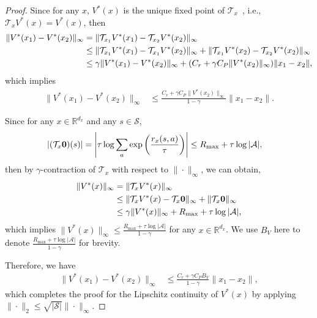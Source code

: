 \documentclass{article}
\theoremstyle{plain}
\theoremstyle{definition}
\theoremstyle{remark}
\def\R{\mathbb R}
\def\cA{\mathcal A}
\def\cS{\mathcal S}
\def\cT{\mathcal T}
\begin{document}
\begin{proof}
    Since for any $x$, $V^*(x)$ is the unique fixed point of $\cT_x$~\citep{nachum2017bridging}, i.e., $\cT_x V^*(x) = V^*(x)$, then
    \begin{align}
        \| V^*(x_1) - V^*(x_2) \|_\infty & = \| \cT_{x_1} V^*(x_1) - \cT_{x_2} V^*(x_2) \|_\infty \notag\\
        & \leq \| \cT_{x_1} V^*(x_1) - \cT_{x_1} V^*(x_2) \|_\infty + \| \cT_{x_1} V^*(x_2) - \cT_{x_2} V^*(x_2) \|_\infty \notag\\
        & \leq \gamma \| V^*(x_1) - V^*(x_2) \|_\infty + (C_r + \gamma C_P \|V^*(x_2)\|_\infty) \|x_1 - x_2\|, \notag
    \end{align}
    which implies
    \begin{align}
        \| V^*(x_1) - V^*(x_2) \|_\infty & \leq \frac{C_r + \gamma C_P \|V^*(x_2)\|_\infty}{1-\gamma} \|x_1 - x_2\|.
    \end{align}
    
    Since for any $x \in \R^{d_x}$ and any $s \in \cS$,
    \begin{align}
       \left|(\cT_x \mathbf{0} ) (s)  \right|& = \left|\tau \log \sum_{a} \exp\left(\frac{r_x(s,a)}{\tau} \right) \right|\leq R_{\max} + \tau \log |\cA|, \notag
    \end{align}
    then by $\gamma$-contraction of $\cT_x$ with respect to $\|\cdot\|_\infty$, we can obtain,
    \begin{align}
        \| V^*(x) \|_\infty & =  \| \cT_x V^*(x) \|_\infty \notag\\ 
        & \leq \| \cT_x V^*(x) - \cT_x \mathbf{0} \|_\infty + \|\cT_x \mathbf{0} \|_\infty \notag\\  
        & \leq \gamma \| V^*(x) \|_\infty + R_{\max} + \tau \log |\cA|, \notag
    \end{align}
    which implies $\| V^*(x) \|_\infty \leq \frac{R_{\max} + \tau \log |\cA|}{1-\gamma}$ for any $x \in \R^{d_x}$. We use $B_V$ here to denote $\frac{R_{\max} + \tau \log |\cA|}{1-\gamma}$ for brevity.

    Therefore, we have
    \begin{align}
        \| V^*(x_1) - V^*(x_2) \|_\infty & \leq \frac{C_r + \gamma C_P B_V}{1-\gamma} \|x_1 - x_2\|,
    \end{align}
    which completes the proof for the Lipschitz continuity of $V^*(x)$ by applying $\|\cdot \|_2 \leq \sqrt{|\cS|} \|\cdot \|_\infty$.


\end{proof}
\end{document}

